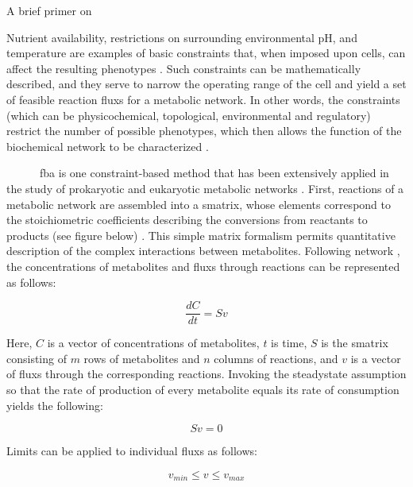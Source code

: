 \begin{pabox}[label=trends:box:fba,float*=t,width=\textwidth]{A brief primer on }
\small
\begin{multicols}{2}
Nutrient availability, restrictions on surrounding 
environmental pH, and temperature are examples of basic 
constraints that, when imposed upon cells, can affect 
the resulting phenotypes \cite{Lee:2006je}. Such constraints can 
be mathematically described, and they serve to narrow 
the operating range of the cell and yield a set of feasible 
reaction \glspl{flux} for a metabolic network. In other words, 
the constraints (which can be physicochemical, 
topological, environmental and regulatory) restrict 
the number of possible phenotypes, which then allows 
the function of the biochemical network to be 
characterized \cite{Lee:2006je,Price:2004hx}.

~~~~~~\gls{fba} is one constraint-based 
method that has been extensively applied in the study 
of prokaryotic and eukaryotic metabolic networks \cite{Oberhardt:2008fr,Duarte:2007iu}. 
First, reactions of a metabolic network are assembled 
into a \gls{smatrix}, whose elements 
correspond to the stoichiometric coefficients describing 
the conversions from reactants to products (see figure below) \cite{Thiele:2010fr,Lee:2006je}. 
This simple matrix formalism permits quantitative 
description of the complex interactions between metabolites. 
Following network , the concentrations of 
metabolites and \glspl{flux} through reactions can be represented 
as follows:

\begin{equation} \label{trends:eq:massbalance}
\frac{dC}{dt} = S v
\end{equation}

Here, $C$ is a vector of concentrations of metabolites, $t$ is 
time, $S$ is the \gls{smatrix} consisting of $m$ rows 
of metabolites and $n$ columns of reactions, and $v$ is a 
vector of \glspl{flux} through the corresponding reactions. 
Invoking the \gls{steadystate} assumption so that the rate 
of production of every metabolite equals its rate of 
consumption yields the following:

\begin{equation} \label{trends:eq:steadystate}
Sv = 0
\end{equation}

Limits can be applied to individual \glspl{flux} as follows:

\begin{equation*}
v_{min} \leq v \leq v_{max}
\end{equation*}


\end{multicols}
\end{pabox}
